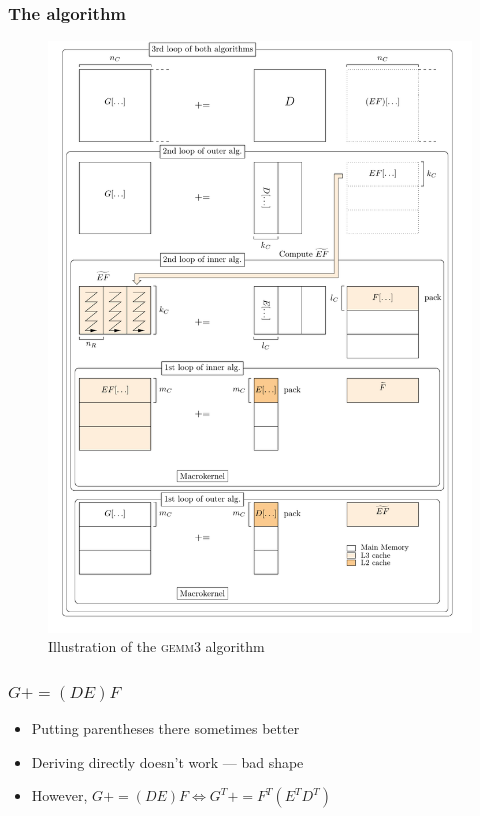 \documentclass{beamer}
\newcommand*{\pluseq}{\mathrel{{+}{=}}}
\newcommand*{\gemmt}{{\textsc{gemm3}}}
\begin{document}
\begin{frame}
  \frametitle{The algorithm}
  \begin{figure}
    \centering
    \includegraphics[height=0.875\textheight]{gemm3-picture}
    \caption{Illustration of the \gemmt{} algorithm}
    \label{fig:gemm3}
\end{figure}
\end{frame}

\begin{frame}
  \frametitle{$G \pluseq (DE)F$}
  \begin{itemize}
  \item Putting parentheses there sometimes better
  \item Deriving directly doesn't work --- bad shape
  \item However, $G \pluseq (DE)F \Leftrightarrow G^T \pluseq F^T(E^TD^T)$
  \end{itemize}
\end{frame}
\end{document}
